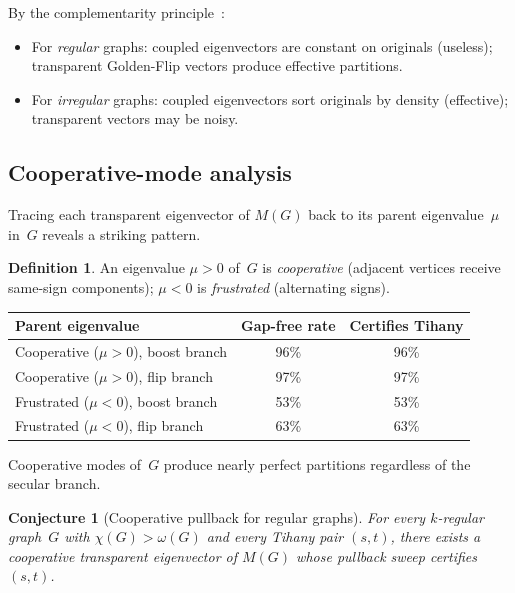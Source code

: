 \documentclass[11pt]{amsart}
\newtheorem{conjecture}[theorem]{Conjecture}
\theoremstyle{definition}
\newtheorem{definition}[theorem]{Definition}
\theoremstyle{remark}
\begin{document}
By the complementarity principle~\cite[Propositions~4.5--4.6]{santos-grt-2026}:
\begin{itemize}
\item For \emph{regular} graphs: coupled eigenvectors are constant 
  on originals (useless); transparent Golden-Flip vectors produce 
  effective partitions.
\item For \emph{irregular} graphs: coupled eigenvectors sort originals 
  by density (effective); transparent vectors may be noisy.
\end{itemize}

\subsection{Cooperative-mode analysis}

Tracing each transparent eigenvector of $M(G)$ back to its parent 
eigenvalue~$\mu$ in~$G$ reveals a striking pattern.

\begin{definition}\label{def:cooperative}
An eigenvalue $\mu > 0$ of~$G$ is \emph{cooperative} (adjacent vertices 
receive same-sign components); $\mu < 0$ is \emph{frustrated} 
(alternating signs).
\end{definition}

\begin{center}
\begin{tabular}{lcc}
\toprule
Parent eigenvalue & Gap-free rate & Certifies Tihany \\
\midrule
Cooperative ($\mu > 0$), boost branch & 96\% & 96\% \\
Cooperative ($\mu > 0$), flip branch & 97\% & 97\% \\
Frustrated ($\mu < 0$), boost branch & 53\% & 53\% \\
Frustrated ($\mu < 0$), flip branch & 63\% & 63\% \\
\bottomrule
\end{tabular}
\end{center}

Cooperative modes of~$G$ produce nearly perfect partitions regardless 
of the secular branch.

\begin{conjecture}[Cooperative pullback for regular graphs]
\label{conj:cooperative}
For every $k$-regular graph~$G$ with $\chi(G) > \omega(G)$ and every 
Tihany pair $(s,t)$, there exists a cooperative transparent eigenvector 
of $M(G)$ whose pullback sweep certifies $(s,t)$.
\end{conjecture}
\end{document}
